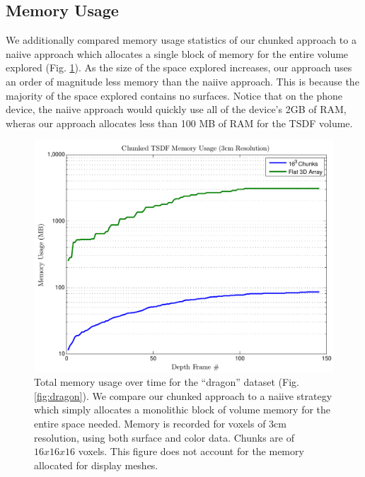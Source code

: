 \documentclass[conference,10pt]{IEEEtran}
\begin{document}
\subsection{Memory Usage}
We additionally compared memory usage statistics of our chunked approach to a
naiive approach which allocates a single block of memory for the entire volume
explored (Fig. \ref{fig:memory}). As the size of the space explored increases, 
our approach uses an order of magnitude less memory than the naiive approach.
This is because the majority of the space explored contains no surfaces. Notice
that on the phone device, the naiive approach would quickly use all of the
device's 2GB of RAM, wheras our approach allocates less than 100 MB of RAM for
the TSDF volume. 

\begin{figure}[t]
  \centering
    \includegraphics[width=1.0\columnwidth]{img/memoryusage.pdf}
      \caption{Total memory usage over time for the ``dragon'' dataset (Fig.
      \ref{fig:dragon}). We compare our chunked approach to a naiive strategy
      which simply allocates a monolithic block of volume memory for the entire
      space needed. Memory is recorded for voxels of 3cm resolution, using both
      surface and color data. Chunks are of $16x16x16$ voxels. This figure does
      not account for the memory allocated for display meshes.}
  \label{fig:memory}
\end{figure}
\end{document}
